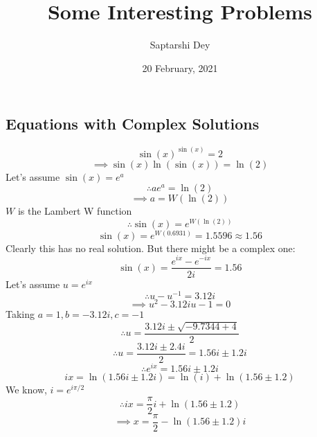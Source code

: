 \documentclass[20pt]{article}
\begin{document}
	\begin{large}
	\title{Some Interesting Problems}
	\author{Saptarshi Dey}
	\date{20 February, 2021}
	\maketitle
	\section{Equations with Complex Solutions}
	\begin{equation*}
	\sin(x)^{\sin(x)} = 2
	\end{equation*}
	\begin{equation*}
	\implies \sin(x)\ln\left(\sin(x)\right) = \ln(2)
	\end{equation*}
	Let's assume $\sin(x) = e^a$ 
	\begin{equation*}
	\therefore ae^a = \ln(2)
	\end{equation*}
	\begin{equation*}
	\implies a = W(\ln(2))
	\end{equation*}
	$W$ is the Lambert W function
	\begin{equation*}
	\therefore \sin(x) = e^{W(\ln(2))}
	\end{equation*}
	\begin{equation*}
	\sin(x) = e^{W(0.6931)} = 1.5596 \approx 1.56
	\end{equation*}
	Clearly this has no real solution. But there might be a complex one:
	\begin{equation*}
	\sin(x)=\frac{e^{ix}-e^{-ix}}{2i} = 1.56
	\end{equation*}
	Let's assume $u = e^{ix}$
	\begin{equation*}
	\therefore u-u^{-1} = 3.12i
	\end{equation*}
	\begin{equation*}
	\implies u^2-3.12iu-1 = 0
	\end{equation*}
	Taking $a=1, b=-3.12i, c=-1$
	\begin{equation*}
	\therefore u = \frac{3.12i \pm \sqrt{-9.7344+4}}{2}
	\end{equation*}
	\begin{equation*}
	\therefore u = \frac{3.12i \pm 2.4i}{2} = 1.56i \pm 1.2i
	\end{equation*}
	\begin{equation*}
	\therefore e^{ix} = 1.56i \pm 1.2i
	\end{equation*}
	\begin{equation*}
	ix = \ln(1.56i \pm 1.2i) = \ln(i) + \ln(1.56 \pm 1.2)
	\end{equation*}
	We know, $i = e^{i\pi/2}$
	\begin{equation*}
		\therefore ix = \frac{\pi}{2}i + \ln(1.56 \pm 1.2)
	\end{equation*}
	\begin{equation*}
		\implies \boxed{x = \frac{\pi}{2} - \ln(1.56 \pm 1.2)i}
	\end{equation*}

\end{large}
\end{document}
